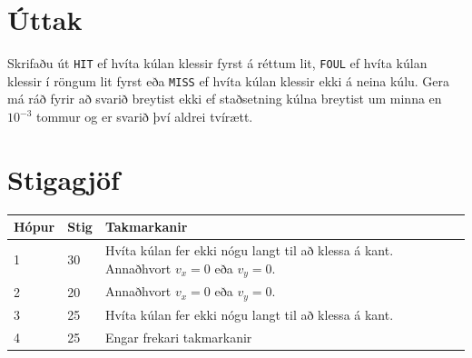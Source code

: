\section*{Úttak}
Skrifaðu út \texttt{HIT} ef hvíta kúlan klessir fyrst á réttum lit,
\texttt{FOUL} ef hvíta kúlan klessir í röngum lit fyrst eða
\texttt{MISS} ef hvíta kúlan klessir ekki á neina kúlu.
Gera má ráð fyrir að svarið breytist ekki ef staðsetning kúlna breytist um minna en $10^{-3}$ tommur og er svarið því aldrei tvírætt.

\section*{Stigagjöf}
\begin{tabular}{|l|l|l|}
\hline
Hópur & Stig & Takmarkanir \\ \hline
1     & 30   & Hvíta kúlan fer ekki nógu langt til að klessa á kant. Annaðhvort $v_x = 0$ eða $v_y = 0$. \\ \hline
2     & 20   & Annaðhvort $v_x = 0$ eða $v_y = 0$. \\ \hline
3     & 25   & Hvíta kúlan fer ekki nógu langt til að klessa á kant. \\ \hline
4     & 25   & Engar frekari takmarkanir\\ \hline
\end{tabular}

